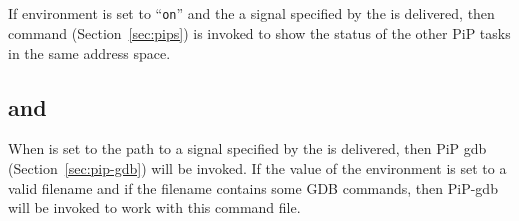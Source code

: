 \subsection{}

If  environment is set to ``{\tt on}'' and the
a signal specified by the  is delivered, then
 command (Section~\ref{sec:pips}) is invoked to show the
status of the other PiP tasks in the same address space.

\subsection{ and }

When  is set to the path to 
a signal specified by the  is delivered, then
PiP gdb (Section~\ref{sec:pip-gdb}) will be invoked. If the value of
the  environment is set to a valid filename
and if the filename contains some GDB commands, then PiP-gdb will be
invoked to work with this command file. 
